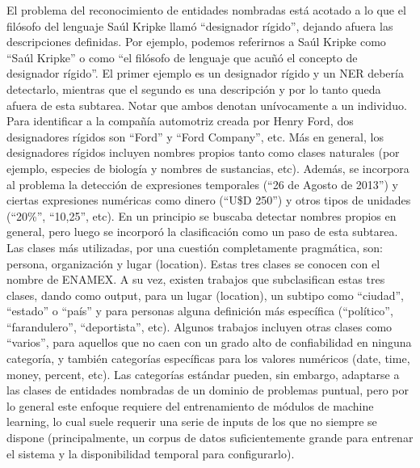 El problema del reconocimiento de entidades nombradas está acotado a lo que el filósofo del lenguaje Saúl Kripke llamó “designador rígido”, dejando afuera las descripciones definidas. Por ejemplo, podemos referirnos a Saúl Kripke como “Saúl Kripke” o como “el filósofo de lenguaje que acuñó el concepto de designador rígido”. El primer ejemplo es un designador rígido y un NER debería detectarlo, mientras que el segundo es una descripción y por lo tanto queda afuera de esta subtarea. Notar que ambos denotan unívocamente a un individuo. Para identificar a la compañía automotriz creada por Henry Ford, dos designadores rígidos son “Ford” y “Ford Company”, etc. Más en general, los designadores rígidos incluyen nombres propios tanto como clases naturales (por ejemplo, especies de biología y nombres de sustancias, etc). Además, se incorpora al problema la detección de expresiones temporales (“26 de Agosto de 2013”) y ciertas expresiones numéricas como dinero (“U\$D 250”) y otros tipos de unidades (“20\%”, “10,25”, etc). En un principio se buscaba detectar nombres propios en general, pero luego se incorporó la clasificación como un paso de esta subtarea. Las clases más utilizadas, por una cuestión completamente pragmática, son: persona, organización y lugar (location). Estas tres clases se conocen con el nombre de ENAMEX. A su vez, existen trabajos que subclasifican estas tres clases, dando como output, para un lugar (location), un subtipo como  “ciudad”, “estado” o  “país” y para personas alguna definición más específica (“político”, “farandulero”, “deportista”, etc). Algunos trabajos incluyen otras clases como “varios”, para aquellos que no caen con un grado alto de confiabilidad en ninguna categoría, y también categorías específicas para los valores numéricos (date, time, money, percent, etc). Las categorías estándar pueden, sin embargo, adaptarse a las clases de entidades nombradas de un dominio de problemas puntual, pero por lo general este enfoque requiere del entrenamiento de módulos de machine learning, lo cual suele requerir una serie de inputs de los que no siempre se dispone (principalmente, un corpus de datos suficientemente grande para entrenar el sistema y la disponibilidad temporal para configurarlo).


